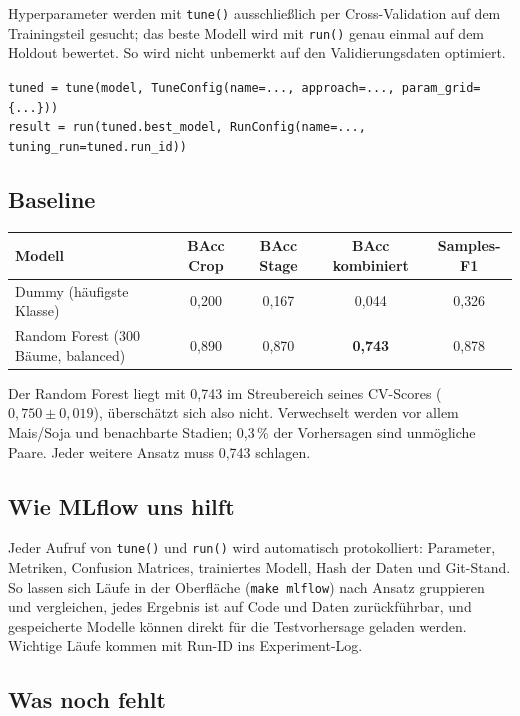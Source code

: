 Hyperparameter werden mit \texttt{tune()} ausschließlich per Cross-Validation auf dem
Trainingsteil gesucht; das beste Modell wird mit \texttt{run()} genau einmal auf dem Holdout
bewertet. So wird nicht unbemerkt auf den Validierungsdaten optimiert.

\smallskip
\noindent\texttt{\small tuned = tune(model, TuneConfig(name=..., approach=..., param\_grid=\{...\}))}\\
\texttt{\small result = run(tuned.best\_model, RunConfig(name=..., tuning\_run=tuned.run\_id))}

\subsection*{Baseline}

\begin{center}
\small
\begin{tabular}{lcccc}
  \toprule
  Modell & BAcc Crop & BAcc Stage & BAcc kombiniert & Samples-F1 \\
  \midrule
  Dummy (häufigste Klasse) & 0{,}200 & 0{,}167 & 0{,}044 & 0{,}326 \\
  Random Forest (300 Bäume, balanced) & 0{,}890 & 0{,}870 & \textbf{0{,}743} & 0{,}878 \\
  \bottomrule
\end{tabular}
\end{center}

Der Random Forest liegt mit 0{,}743 im Streubereich seines CV-Scores ($0{,}750 \pm 0{,}019$),
überschätzt sich also nicht. Verwechselt werden vor allem Mais/Soja und benachbarte Stadien;
0{,}3\,\% der Vorhersagen sind unmögliche Paare. Jeder weitere Ansatz muss 0{,}743 schlagen.

\subsection*{Wie MLflow uns hilft}

Jeder Aufruf von \texttt{tune()} und \texttt{run()} wird automatisch protokolliert: Parameter,
Metriken, Confusion Matrices, trainiertes Modell, Hash der Daten und Git-Stand. So lassen sich
Läufe in der Oberfläche (\texttt{make mlflow}) nach Ansatz gruppieren und vergleichen, jedes
Ergebnis ist auf Code und Daten zurückführbar, und gespeicherte Modelle können direkt für die
Testvorhersage geladen werden. Wichtige Läufe kommen mit Run-ID ins Experiment-Log.

\subsection*{Was noch fehlt}

